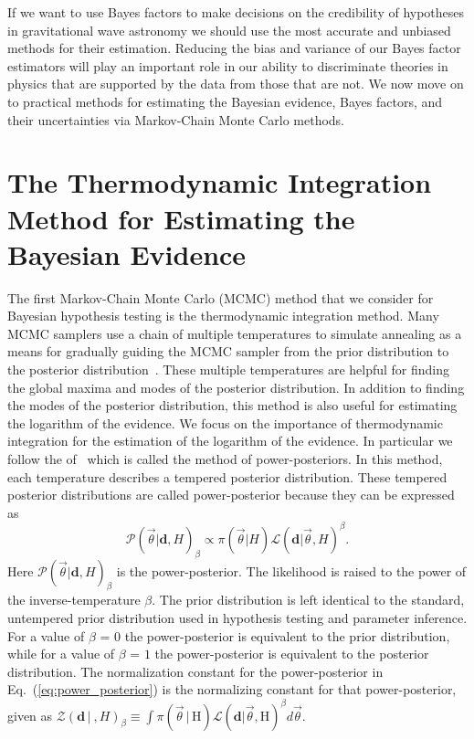 If we want to use Bayes factors to make decisions on the credibility of hypotheses in gravitational wave astronomy we should use the most accurate and unbiased methods for their estimation. Reducing the bias and variance of our Bayes factor estimators will play an important role in our ability to discriminate theories in physics that are supported by the data from those that are not. We now move on to practical methods for estimating the Bayesian evidence, Bayes factors, and their uncertainties via Markov-Chain Monte Carlo methods.

\section{The Thermodynamic Integration Method for Estimating the Bayesian Evidence}\label{sec:ti}
The first Markov-Chain Monte Carlo (MCMC) method that we consider for Bayesian hypothesis testing is the thermodynamic integration method. Many MCMC samplers use a chain of multiple temperatures to simulate annealing as a means for gradually guiding the MCMC sampler from the prior distribution to the posterior distribution~\citep{emcee, vousden:2016, doi:10.1143/PTPS.157.317, B509983H}. These multiple temperatures are helpful for finding the global maxima and modes of the posterior distribution. In addition to finding the modes of the posterior distribution, this method is also useful for estimating the logarithm of the evidence. We focus on the importance of thermodynamic integration for the estimation of the logarithm of the evidence. In particular we follow the of~\cite{lartillot2006computing, friel2008marginal} which is called the method of power-posteriors. In this method, each temperature describes a tempered posterior distribution. These tempered posterior distributions are called power-posterior because they can be expressed as
\begin{equation}
    \mathcal{P}\left(\vec{\theta}|\mathbf{d}, H\right)_\beta \propto \pi\left(\vec{\theta} | H\right) \mathcal{L}\left(\mathbf{d} | \vec{\theta}, H\right)^\beta.
\end{equation}\label{eq:power_posterior}
Here $\mathcal{P}\left(\vec{\theta}|\mathbf{d}, H\right)_\beta$ is the power-posterior. The likelihood is raised to the power of the inverse-temperature $\beta$. The prior distribution is left identical to the standard, untempered prior distribution used in hypothesis testing and parameter inference. For a value of $\beta$ = $0$ the power-posterior is equivalent to the prior distribution, while for a value of $\beta$ = $1$ the power-posterior is equivalent to the posterior distribution. The normalization constant for the power-posterior in Eq.~(\ref{eq:power_posterior}) is the normalizing constant for that power-posterior, given as $\mathcal{Z}(\mathbf{d} \, | \ ,H)_\beta \equiv \int \pi\left(\vec{\theta} \, | \, \mathrm{H}\right) \mathcal{L}\left(\mathbf{d} | \vec{\theta}, \mathrm{H}\right)^\beta d\vec{\theta}$.

